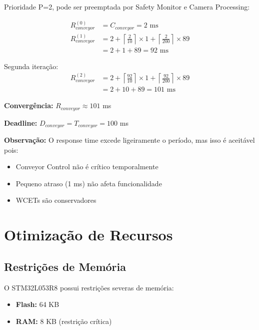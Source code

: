 \documentclass[12pt,a4paper]{article}
\begin{document}
Prioridade P=2, pode ser preemptada por Safety Monitor e Camera Processing:

\begin{align}
R_{conveyor}^{(0)} &= C_{conveyor} = 2 \text{ ms} \\
R_{conveyor}^{(1)} &= 2 + \left\lceil \frac{2}{10} \right\rceil \times 1 + \left\lceil \frac{2}{200} \right\rceil \times 89 \\
&= 2 + 1 + 89 = 92 \text{ ms}
\end{align}

Segunda iteração:
\begin{align}
R_{conveyor}^{(2)} &= 2 + \left\lceil \frac{92}{10} \right\rceil \times 1 + \left\lceil \frac{92}{200} \right\rceil \times 89 \\
&= 2 + 10 + 89 = 101 \text{ ms}
\end{align}

\textbf{Convergência:} $R_{conveyor} \approx 101$ ms

\textbf{Deadline:} $D_{conveyor} = T_{conveyor} = 100$ ms

\textbf{Observação:} O response time excede ligeiramente o período, mas isso é aceitável pois:
\begin{itemize}
    \item Conveyor Control não é crítico temporalmente
    \item Pequeno atraso (1 ms) não afeta funcionalidade
    \item WCETs são conservadores
\end{itemize}

\section{Otimização de Recursos}

\subsection{Restrições de Memória}

O STM32L053R8 possui restrições severas de memória:
\begin{itemize}
    \item \textbf{Flash:} 64 KB
    \item \textbf{RAM:} 8 KB (restrição crítica)
\end{itemize}
\end{document}
